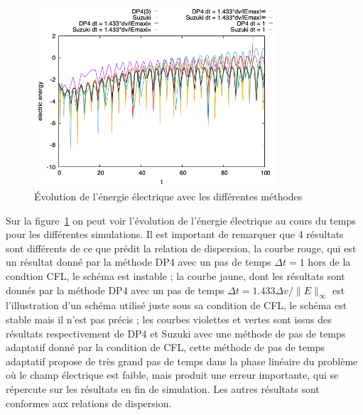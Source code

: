 \begin{figure}[h]
  \centering
  \includegraphics[width=0.8\textwidth]{img/compare_ee.png}
  \caption{Évolution de l'énergie électrique avec les différentes méthodes}
  \label{fig:compare:ee}
\end{figure}

Sur la figure~\ref{fig:compare:ee} on peut voir l'évolution de l'énergie électrique au cours du temps pour les différentes simulations. Il est important de remarquer que 4 résultats sont différents de ce que prédit la relation de dispersion, la courbe rouge, qui est un résultat donné par la méthode DP4 avec un pas de temps $\Delta t=1$ hors de la condtion CFL, le schéma est instable ; la courbe jaune, dont les résultats sont donnés par la méthode DP4 avec un pas de temps $\Delta t=1.433\Delta v/\|E\|_\infty$ est l'illustration d'un schéma utilisé juste sous sa condition de CFL, le schéma est stable mais il n'est pas précis ; les courbes violettes et vertes sont issus des résultats respectivement de DP4 et Suzuki avec une méthode de pas de temps adaptatif donné par la condition de CFL, cette méthode de pas de temps adaptatif propose de très grand pas de temps dans la phase linéaire du problème où le champ électrique est faible, mais produit une erreur importante, qui se répercute sur les résultats en fin de simulation. Les autres résultats sont conformes aux relations de dispersion. 


